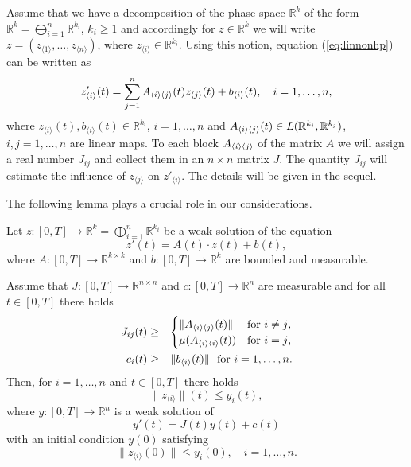 Assume that we have a decomposition of the phase space $\mathbb{R}^k$ of the form $\mathbb{R}^k=\bigoplus_{i=1}^n
\mathbb{R}^{k_i}$, $k_i\geq 1$ and accordingly for $z \in
\mathbb{R}^k$ we will write $z=(z_{\langle1\rangle},\dots,z_{\langle n\rangle})$, where $z_{\langle i\rangle} \in
\mathbb{R}^{k_i}$. Using this notion, equation (\ref{eq:linnonhp}) can be written as
\begin{equation*}
  z'_{\langle i\rangle}(t)= \sum_{j=1}^n A_{\langle i \rangle \langle j \rangle}(t)z_{\langle j\rangle}(t) + b_{\langle i\rangle}(t), \quad i=1,\dots,n,
\end{equation*}
where $z_{\langle i\rangle}(t), b_{\langle i\rangle}(t) \in \mathbb{R}^{k_i}$, $i=1,\dots,n$ and $A_{\langle i \rangle \langle j \rangle}(t) \in
L(\mathbb{R}^{k_i},\mathbb{R}^{k_j})$, $i,j=1,\ldots,n$ are linear maps. To each block $A_{\langle i \rangle \langle j \rangle}$ of the matrix $A$ we will assign a real number $J_{ij}$ and collect them in an $n\times n$ matrix $J$. The quantity $J_{ij}$ will estimate the influence of $z_{\langle j\rangle}$ on $z'_{\langle i\rangle}$. The details will be given in the sequel.








The following lemma plays a crucial role in our considerations.
\begin{lemma}\cite[Lemma 4.1]{KZ}\label{lem:boundOnVariationalLinEq}
Let $z:[0,T] \to {\mathbb R}^k=\bigoplus_{i=1}^n \mathbb{R}^{k_i}$ be a weak solution of the equation
\begin{equation*}
  z'(t)=A(t) \cdot z(t) + b(t),
\end{equation*}
where $A:[0,T]\to {\mathbb R}^{k \times k}$ and $b:[0,T] \to {\mathbb R}^k$ are bounded and measurable.

Assume that $J:[0,T] \to\mathbb{R}^{n \times n}$ and $c:[0,T]\to\mathbb R^n$ are measurable and for all $t \in [0,T]$ there holds
\begin{eqnarray*}%
 J_{ij}(t) &\geq&
  \begin{cases}
      \|\BD{A}{i}{j}(t) \|  & \text{for $i \neq j$}, \\
     \mu(\BD{A}{i}{i}(t))  & \text{for $i=j$},
  \end{cases}\\
  c_i(t)&\geq&\|b_{\langle i\rangle}(t)\|\ \text{ for $i=1,\ldots,n$}.
\end{eqnarray*}
Then, for $i=1,\ldots,n$ and $t\in[0,T]$ there holds
\begin{equation*}
  \|z_{\langle i\rangle}\|(t) \leq y_i(t),
\end{equation*}
where  $y:[0,T] \to \mathbb{R}^n$ is a weak solution of 
\begin{equation*}
   y'(t)=J(t)y(t) + c(t)
\end{equation*}
with an initial condition $y(0)$ satisfying
\begin{equation*}
	\|z_{\langle i\rangle}(0)\|\leq y_i(0),\quad i=1,\ldots,n.
\end{equation*}
\end{lemma}

